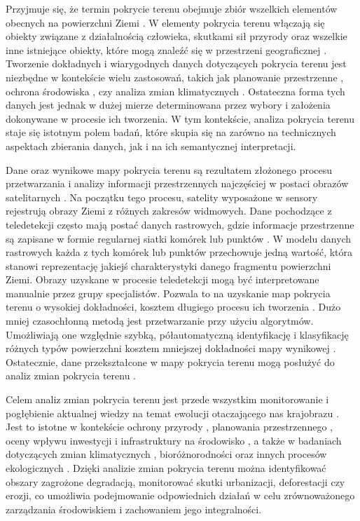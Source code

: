 \documentclass{amuthesis}
\begin{document}
Przyjmuje się, że termin pokrycie terenu obejmuje zbiór wszelkich
elementów obecnych na powierzchni Ziemi \autocite{Fisher2005}. W
elementy pokrycia terenu włączają się obiekty związane z działalnością
człowieka, skutkami sił przyrody oraz wszelkie inne istniejące obiekty,
które mogą znaleźć się w przestrzeni geograficznej
\autocite{zwolinski2018}. Tworzenie dokładnych i wiarygodnych danych
dotyczących pokrycia terenu jest niezbędne w kontekście wielu
zastosowań, takich jak planowanie przestrzenne
\autocite{bibby1999monitoring}, ochrona środowiska
\autocite{natura2000_land_cover}, czy analiza zmian klimatycznych
\autocite{dravskovic2020climate}. Ostateczna forma tych danych jest
jednak w dużej mierze determinowana przez wybory i założenia dokonywane
w procesie ich tworzenia. W tym kontekście, analiza pokrycia terenu
staje się istotnym polem badań, które skupia się na zarówno na
technicznych aspektach zbierania danych, jak i na ich semantycznej
interpretacji.

Dane oraz wynikowe mapy pokrycia terenu są rezultatem złożonego procesu
przetwarzania i analizy informacji przestrzennych najczęściej w postaci
obrazów satelitarnych
\autocite{ChangeDetectionTechniques,Jasiewicz_GeoPAT}. Na początku tego
procesu, satelity wyposażone w sensory rejestrują obrazy Ziemi z różnych
zakresów widmowych. Dane pochodzące z teledetekcji często mają postać
danych rastrowych, gdzie informacje przestrzenne są zapisane w formie
regularnej siatki komórek lub punktów \autocite{glazewski2006modele}. W
modelu danych rastrowych każda z tych komórek lub punktów przechowuje
jedną wartość, która stanowi reprezentację jakiejś charakterystyki
danego fragmentu powierzchni Ziemi. Obrazy uzyskane w procesie
teledetekcji mogą być interpretowane manualnie przez grupy specjalistów.
Pozwala to na uzyskanie map pokrycia terenu o wysokiej dokładności,
kosztem długiego procesu ich tworzenia \autocite{CUNNINGHAM2006217}.
Dużo mniej czasochłonną metodą jest przetwarzanie przy użyciu
algorytmów. Umożliwiają one względnie szybką, półautomatyczną
identyfikację i klasyfikację różnych typów powierzchni kosztem mniejszej
dokładności mapy wynikowej \autocite{CUNNINGHAM2006217}. Ostatecznie,
dane przekształcone w mapy pokrycia terenu mogą posłużyć do analiz zmian
pokrycia terenu \autocite{Feranec2007,Sleeter2013,Mierzwiak_Całka_2019}.

Celem analiz zmian pokrycia terenu jest przede wszystkim monitorowanie i
pogłębienie aktualnej wiedzy na temat ewolucji otaczającego nas
krajobrazu \autocite{ChangeDetectionTechniques}. Jest to istotne w
kontekście ochrony przyrody \autocite{lulcc_natura2000}, planowania
przestrzennego \autocite{urbanplanning}, oceny wpływu inwestycji i
infrastruktury na środowisko \autocite{infrastructure_environment}, a
także w badaniach dotyczących zmian klimatycznych
\autocite{lulcc_climate_change}, bioróżnorodności
\autocite{lulcc_biodiversity} oraz innych procesów ekologicznych
\autocite{ChangeDetectionTechniques}. Dzięki analizie zmian pokrycia
terenu można identyfikować obszary zagrożone degradacją, monitorować
skutki urbanizacji, deforestacji czy erozji, co umożliwia podejmowanie
odpowiednich działań w celu zrównoważonego zarządzania środowiskiem i
zachowaniem jego integralności.
\end{document}
